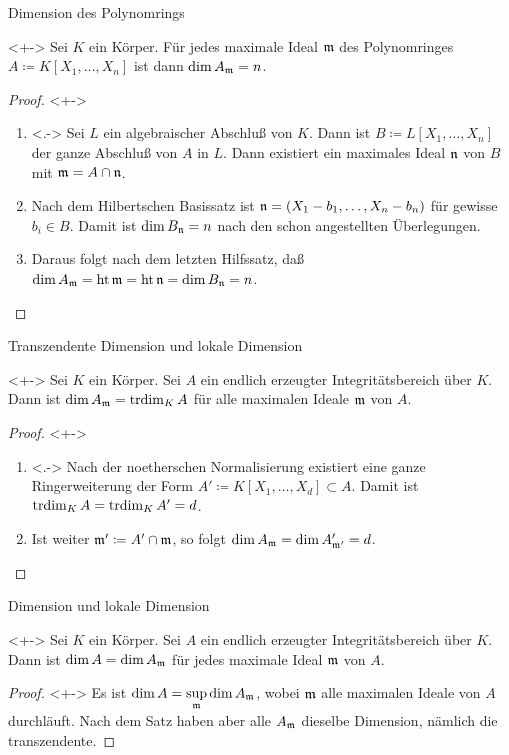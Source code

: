 \begin{frame}{Dimension des Polynomrings}
	\begin{lemma}<+->
		Sei \(K\) ein Körper. Für jedes maximale Ideal \(\mathfrak{m}\) des
		Polynomringes \(A \coloneqq K[X_1, \dotsc, X_n]\) ist dann
		\(\dim A_{\mathfrak{m}} = n\).
	\end{lemma}
	\begin{proof}<+->
		\begin{enumerate}[<+->]
		\item<.->
			Sei \(L\) ein algebraischer Abschluß von \(K\).
			Dann ist \(B \coloneqq L[X_1, \dotsc, X_n]\) der ganze
			Abschluß von \(A\) in \(L\). Dann existiert ein maximales
			Ideal \(\mathfrak{n}\) von \(B\) mit \(\mathfrak{m} = A \cap \mathfrak{n}\).
		\item		
			Nach dem Hilbertschen Basissatz ist
			\(\mathfrak{n} = (X_1 - b_1, \dotsc, X_n - b_n)\) für gewisse
			\(b_i \in B\). Damit ist \(\dim B_{\mathfrak{n}} = n\) nach den
			schon angestellten Überlegungen.
		\item
			Daraus folgt nach dem letzten Hilfssatz, daß \(\dim A_{\mathfrak{m}}
			= \operatorname{ht} \mathfrak{m} = \operatorname{ht} \mathfrak{n} = \dim B_{\mathfrak{n}} = n\).
			\qedhere
		\end{enumerate}
	\end{proof}
\end{frame}

\begin{frame}{Transzendente Dimension und lokale Dimension}
	\begin{theorem}<+->
		Sei \(K\) ein Körper. Sei \(A\) ein endlich erzeugter
		Integritätsbereich über \(K\). Dann ist \(\dim A_{\mathfrak{m}} = \operatorname{trdim}_K A\) für
		alle maximalen Ideale \(\mathfrak{m}\) von \(A\).
	\end{theorem}
	\begin{proof}<+->
		\begin{enumerate}[<+->]
		\item<.->
			Nach der noetherschen Normalisierung existiert eine ganze
			Ringerweiterung der Form \(A' \coloneqq K[X_1, \dotsc, X_d] \subset A\).
			Damit ist \(\operatorname{trdim}_K A = \operatorname{trdim}_K A' = d\).
		\item
			Ist weiter \(\mathfrak{m}' \coloneqq A' \cap \mathfrak{m}\), so folgt
			\(\dim A_{\mathfrak{m}} = \dim A'_{\mathfrak{m}'} = d\).
			\qedhere
		\end{enumerate}
	\end{proof}
\end{frame}

\begin{frame}{Dimension und lokale Dimension}
	\begin{corollary}<+->
		Sei \(K\) ein Körper. Sei \(A\) ein endlich erzeugter Integritätsbereich
		über \(K\). Dann ist \(\dim A = \dim A_{\mathfrak{m}}\) für jedes maximale
		Ideal \(\mathfrak{m}\) von \(A\).
	\end{corollary}
	\begin{proof}<+->
		Es ist \(\dim A = \sup\limits_{\mathfrak{m}} \dim A_{\mathfrak{m}}\), wobei
		\(\mathfrak{m}\) alle maximalen Ideale von \(A\) durchläuft. Nach dem
		Satz haben aber alle \(A_{\mathfrak{m}}\) dieselbe Dimension, nämlich die
		transzendente.
	\end{proof}
\end{frame}

